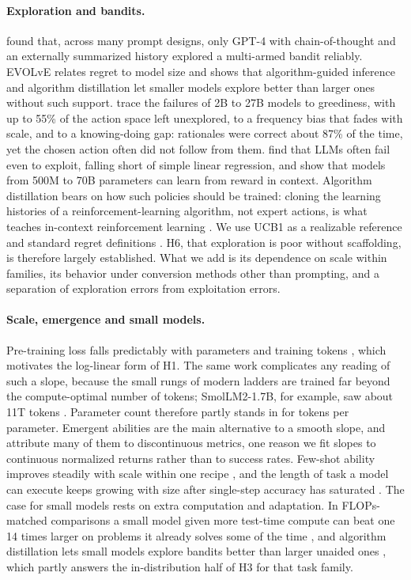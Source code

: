 \paragraph{Exploration and bandits.}
\citet{krishnamurthy2024explore} found that, across many prompt designs, only GPT-4 with chain-of-thought and an externally summarized history explored a multi-armed bandit reliably. EVOLvE \citep{nie2025evolve} relates regret to model size and shows that algorithm-guided inference and algorithm distillation let smaller models explore better than larger ones without such support. \citet{schmied2026greedy} trace the failures of 2B to 27B models to greediness, with up to 55\% of the action space left unexplored, to a frequency bias that fades with scale, and to a knowing-doing gap: rationales were correct about 87\% of the time, yet the chosen action often did not follow from them. \citet{harris2026explore} find that LLMs often fail even to exploit, falling short of simple linear regression, and \citet{monea2025icrl} show that models from 500M to 70B parameters can learn from reward in context. Algorithm distillation bears on how such policies should be trained: cloning the learning histories of a reinforcement-learning algorithm, not expert actions, is what teaches in-context reinforcement learning \citep{laskin2023incontext}. We use UCB1 \citep{auer2002ucb} as a realizable reference and standard regret definitions \citep{lattimore2020bandit}. H6, that exploration is poor without scaffolding, is therefore largely established. What we add is its dependence on scale within families, its behavior under conversion methods other than prompting, and a separation of exploration errors from exploitation errors.

\paragraph{Scale, emergence and small models.}
Pre-training loss falls predictably with parameters and training tokens \citep{hoffmann2022chinchilla}, which motivates the log-linear form of H1. The same work complicates any reading of such a slope, because the small rungs of modern ladders are trained far beyond the compute-optimal number of tokens; SmolLM2-1.7B, for example, saw about 11T tokens \citep{allal2025smollm2}. Parameter count therefore partly stands in for tokens per parameter. Emergent abilities \citep{wei2022emergent} are the main alternative to a smooth slope, and \citet{schaeffer2023mirage} attribute many of them to discontinuous metrics, one reason we fit slopes to continuous normalized returns rather than to success rates. Few-shot ability improves steadily with scale within one recipe \citep{brown2020gpt3}, and the length of task a model can execute keeps growing with size after single-step accuracy has saturated \citep{sinha2026illusion}. The case for small models rests on extra computation and adaptation. In FLOPs-matched comparisons a small model given more test-time compute can beat one 14 times larger on problems it already solves some of the time \citep{snell2025ttc}, and algorithm distillation lets small models explore bandits better than larger unaided ones \citep{nie2025evolve}, which partly answers the in-distribution half of H3 for that task family.

